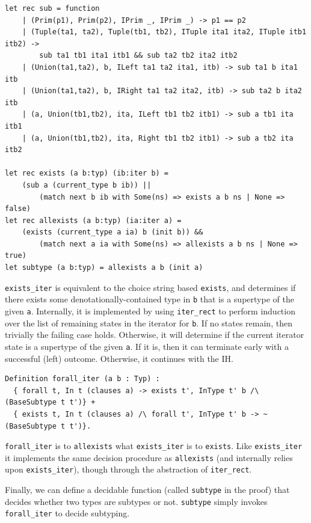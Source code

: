 \documentclass[a4paper,english]{lipics-v2019}
\begin{document}
\begin{small}\begin{verbatim}
let rec sub = function
    | (Prim(p1), Prim(p2), IPrim _, IPrim _) -> p1 == p2
    | (Tuple(ta1, ta2), Tuple(tb1, tb2), ITuple ita1 ita2, ITuple itb1 itb2) ->
        sub ta1 tb1 ita1 itb1 && sub ta2 tb2 ita2 itb2
    | (Union(ta1,ta2), b, ILeft ta1 ta2 ita1, itb) -> sub ta1 b ita1 itb
    | (Union(ta1,ta2), b, IRight ta1 ta2 ita2, itb) -> sub ta2 b ita2 itb
    | (a, Union(tb1,tb2), ita, ILeft tb1 tb2 itb1) -> sub a tb1 ita itb1
    | (a, Union(tb1,tb2), ita, Right tb1 tb2 itb1) -> sub a tb2 ita itb2
    
let rec exists (a b:typ) (ib:iter b) =
    (sub a (current_type b ib)) || 
        (match next b ib with Some(ns) => exists a b ns | None => false)
let rec allexists (a b:typ) (ia:iter a) =
    (exists (current_type a ia) b (init b)) && 
        (match next a ia with Some(ns) => allexists a b ns | None => true)
let subtype (a b:typ) = allexists a b (init a)
\end{verbatim}\end{small}

\verb|exists_iter| is equivalent to the choice string based \verb|exists|,
and determines if there exists some denotationally-contained type in \verb|b|
that is a supertype of the given \verb|a|. Internally, it is implemented by 
using \verb|iter_rect| to perform induction over the list of remaining states in
the iterator for \verb|b|. If no states remain, then trivially the failing case holds.
Otherwise, it will determine if the current iterator state is a supertype of the given
\verb|a|. If it is, then it can terminate early with a successful (left) outcome. Otherwise,
it continues with the IH.

\begin{small}\begin{verbatim}
Definition forall_iter (a b : Typ) :
  { forall t, In t (clauses a) -> exists t', InType t' b /\ (BaseSubtype t t')} +
  { exists t, In t (clauses a) /\ forall t', InType t' b -> ~ (BaseSubtype t t')}.
\end{verbatim}\end{small}

\verb|forall_iter| is to \verb|allexists| what \verb|exists_iter| is to
\verb|exists|. Like \verb|exists_iter| it implements the same decision procedure
as \verb|allexists| (and internally relies upon \verb|exists_iter|), though through
the abstraction of \verb|iter_rect|.

Finally, we can define a decidable function (called \verb|subtype| in the proof)
that decides whether two types are subtypes or not. \verb|subtype| simply invokes
\verb|forall_iter| to decide subtyping.
\end{document}
